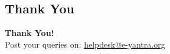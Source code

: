 \documentclass[table,10pt,red]{beamer}	%
\begin{document}
\subsection{Thank You} %
\begin{frame}
\hskip4cm
\textbf{\LARGE Thank You!} \\[20pt]
\hskip3cm
\scriptsize Post your queries on: 
\hyperref[helpdesk@e-yantra.org]{\color{blue} helpdesk@e-yantra.org \color{black}} 
\end{frame}
\end{document}
